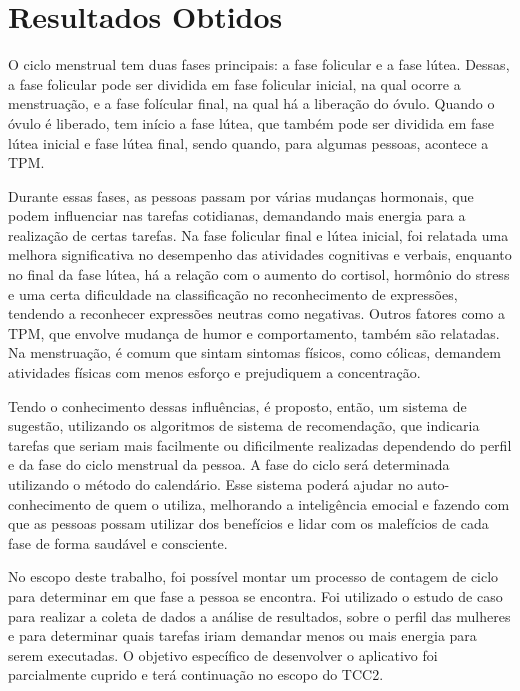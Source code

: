 \chapter[Resultados Obtidos]{Resultados Obtidos}

O ciclo menstrual tem duas fases principais: a fase folicular e a fase lútea. Dessas, a fase folicular 
pode 
ser dividida em fase folicular inicial, na qual ocorre a menstruação, e a fase folícular final, na qual 
há a liberação do óvulo.
Quando o óvulo é liberado, tem início a fase lútea, que também pode ser dividida em fase lútea inicial e 
fase lútea final, sendo quando, para algumas pessoas, acontece a TPM.

Durante essas fases, as pessoas passam por várias mudanças hormonais, que podem influenciar nas tarefas 
cotidianas, demandando mais energia para a realização de certas tarefas. Na fase folicular final e lútea inicial,
foi relatada uma melhora significativa no desempenho das atividades cognitivas e verbais, enquanto no final da fase 
lútea, há a relação com o aumento do cortisol, hormônio do stress e uma certa dificuldade na classificação 
no reconhecimento de expressões, tendendo a reconhecer expressões neutras como negativas. Outros fatores como a TPM, que envolve
mudança de humor e comportamento, também são relatadas. Na menstruação, é comum que sintam sintomas físicos, como cólicas, demandem 
atividades físicas com menos esforço e prejudiquem a concentração. 

Tendo o conhecimento dessas influências, é proposto, então, um sistema de sugestão, utilizando os algoritmos de sistema de recomendação, 
que indicaria tarefas que seriam mais facilmente ou dificilmente realizadas dependendo do perfil e da fase do ciclo menstrual da pessoa. A fase 
do ciclo será determinada utilizando o método do calendário. Esse sistema poderá ajudar no auto-conhecimento de quem o utiliza, melhorando a inteligência emocial e fazendo com que 
as pessoas possam utilizar dos benefícios e lidar com os malefícios de cada fase de forma saudável e consciente.

No escopo deste trabalho, foi possível montar um processo de contagem de ciclo para determinar em que fase a pessoa se encontra. Foi utilizado 
o estudo de caso para realizar a coleta de dados a análise de resultados, sobre o perfil das mulheres e para determinar quais tarefas iriam demandar 
menos ou mais energia para serem executadas. O objetivo específico de desenvolver o aplicativo foi parcialmente cuprido e terá continuação no escopo do TCC2.

